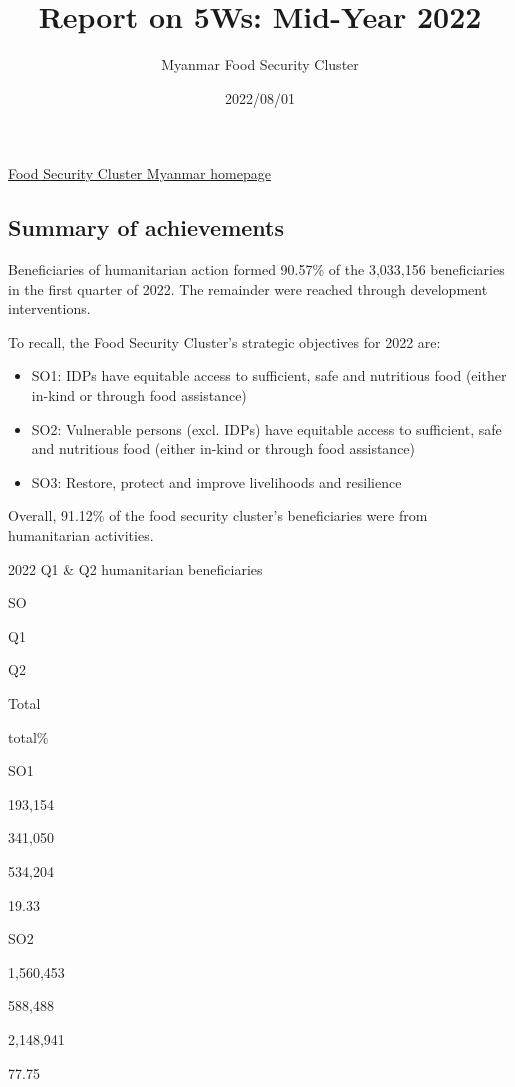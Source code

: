 \documentclass[
]{article}
\title{\textbf{Report on 5Ws: Mid-Year 2022}}
\author{Myanmar Food Security Cluster}
\date{2022/08/01}
\providecommand{\tightlist}{%
  \setlength{\itemsep}{0pt}\setlength{\parskip}{0pt}}
\begin{document}
\maketitle

{
\hypersetup{linkcolor=}
\setcounter{tocdepth}{4}
\tableofcontents
}
\href{https://food-security-cluster-myanmar.github.io/}{Food Security
Cluster Myanmar homepage}

\hypertarget{summary-of-achievements}{%
\subsection{Summary of achievements}\label{summary-of-achievements}}

Beneficiaries of humanitarian action formed 90.57\% of the 3,033,156
beneficiaries in the first quarter of 2022. The remainder were reached
through development interventions.

To recall, the Food Security Cluster's strategic objectives for 2022
are:

\begin{itemize}
\tightlist
\item
  SO1: IDPs have equitable access to sufficient, safe and nutritious
  food (either in-kind or through food assistance)
\item
  SO2: Vulnerable persons (excl. IDPs) have equitable access to
  sufficient, safe and nutritious food (either in-kind or through food
  assistance)
\item
  SO3: Restore, protect and improve livelihoods and resilience
\end{itemize}

Overall, 91.12\% of the food security cluster's beneficiaries were from
humanitarian activities.

2022 Q1 \& Q2 humanitarian beneficiaries

SO

Q1

Q2

Total

total\%

SO1

193,154

341,050

534,204

19.33

SO2

1,560,453

588,488

2,148,941

77.75
\end{document}
